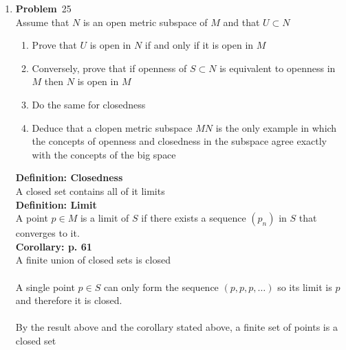 \documentclass[12pt]{amsart}
\newcommand{\benu}{\begin{enumerate}}
\newcommand{\eenu}{\end{enumerate}}
\theoremstyle{definition}
\newcommand{\itep}{\item {\bfseries Problem}\ }
\begin{document}
\begin{enumerate}[series=p]
\itep 25\\
Assume that $N$ is an open metric subspace of $M$ and that $U \subset N$
\benu
\item Prove that $U$ is open in $N$ if and only if it is open in $M$
\item Conversely, prove that if openness of $S \subset N$ is equivalent to openness in $M$ then $N$ is open in $M$
\item Do the same for closedness
\item Deduce that a clopen metric subspace $MN$ is the only example in which the concepts of openness and closedness in the subspace agree exactly with the concepts of the big space
\eenu
\textbf{Definition: Closedness}\\
A closed set contains all of it limits\\
\textbf{Definition: Limit}\\
A point $p \in M$ is a limit of $S$ if there exists a sequence $(p_n)$ in $S$ that converges to it.\\
\textbf{Corollary: p. 61}\\
A finite union of closed sets is closed
\\\\
A single point $p \in S$ can only form the sequence $(p, p, p, \dots)$ so its limit is $p$ and therefore it is closed.\\
\\
By the result above and the corollary stated above, a finite set of points is a closed set


\end{enumerate}
\end{document}
